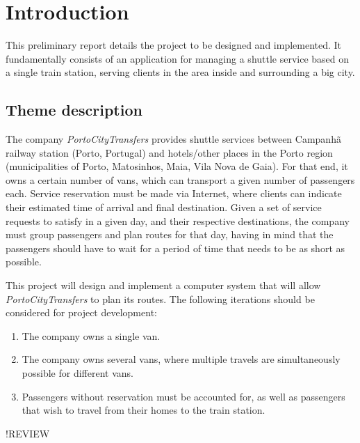 \chapter{Introduction} \label{introduction}
This preliminary report details the project to be designed and implemented.
It fundamentally consists of an application for managing a shuttle service based on a single train station, serving clients in the area inside and surrounding a big city.
\section{Theme description}
The company \emph{PortoCityTransfers} provides shuttle services between Campanhã railway station (Porto, Portugal) and hotels/other places in the Porto region (municipalities of Porto, Matosinhos, Maia, Vila Nova de Gaia). For that end, it owns a certain number of vans, which can transport a given number of passengers each. Service reservation must be made via Internet, where clients can indicate their estimated time of arrival and final destination. Given a set of service requests to satisfy in a given day, and their respective destinations, the company must group passengers and plan routes for that day, having in mind that the passengers should have to wait for a period of time that needs to be as short as possible.\par
This project will design and implement a computer system that will allow \emph{PortoCityTransfers} to plan its routes. The following iterations should be considered for project development:
\begin{enumerate}
    \item The company owns a single van.
    \item The company owns several vans, where multiple travels are simultaneously possible for different vans.
    \item Passengers without reservation must be accounted for, as well as passengers that wish to travel from their homes to the train station.
\end{enumerate}
!REVIEW

